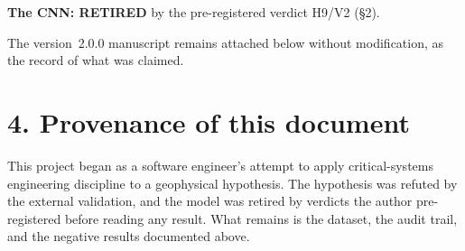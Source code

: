 \documentclass[11pt]{article}
\begin{document}
\textbf{The CNN: RETIRED} by the pre-registered verdict H9/V2 (\S2).

The version~2.0.0 manuscript remains attached below without
modification, as the record of what was claimed.

\section*{4. Provenance of this document}

This project began as a software engineer's attempt to apply
critical-systems engineering discipline to a geophysical hypothesis. The
hypothesis was refuted by the external validation, and the model was
retired by verdicts the author pre-registered before reading any result.
What remains is the dataset, the audit trail, and the negative results
documented above.
\end{document}
